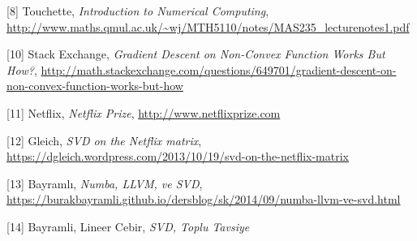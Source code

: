 \documentclass[12pt,fleqn]{article}\usepackage{../../common}
\begin{document}
[8] Touchette, {\em Introduction to Numerical Computing},
    \url{http://www.maths.qmul.ac.uk/~wj/MTH5110/notes/MAS235_lecturenotes1.pdf}

[10] Stack Exchange, {\em Gradient Descent on Non-Convex Function Works But How?},
     \url{http://math.stackexchange.com/questions/649701/gradient-descent-on-non-convex-function-works-but-how}

[11] Netflix, {\em Netflix Prize},
     \url{http://www.netflixprize.com}

[12] Gleich, {\em SVD on the Netflix matrix},
     \url{https://dgleich.wordpress.com/2013/10/19/svd-on-the-netflix-matrix}

[13] Bayramlı, {\em Numba, LLVM, ve SVD}, 
     \url{https://burakbayramli.github.io/dersblog/sk/2014/09/numba-llvm-ve-svd.html}

[14] Bayramli, Lineer Cebir, {\em SVD, Toplu Tavsiye}
\end{document}
